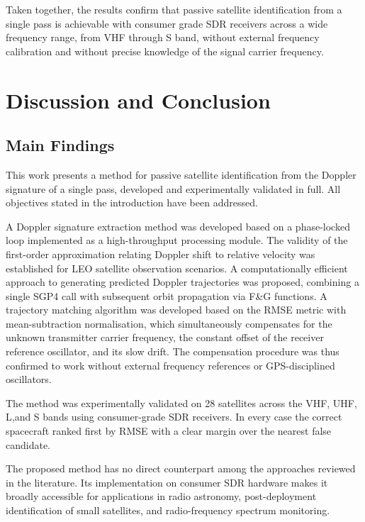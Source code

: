 \documentclass[lineno,pdflatex,sn-basic,referee,]{sn-jnl}
\begin{document}
Taken together, the results confirm that passive satellite identification from a single pass is achievable with consumer grade SDR receivers across a wide frequency range, from VHF through S band, without external frequency calibration and without precise knowledge of the signal carrier frequency.


\section{Discussion and Conclusion}
\label{sec:conclusion}

\subsection{Main Findings}
\label{subsec:findings}

This work presents a method for passive satellite identification from the Doppler signature of a single pass, developed and experimentally validated in full. All objectives stated in the introduction have been addressed.

A Doppler signature extraction method was developed based on a phase-locked loop implemented as a high-throughput processing module. The validity of the first-order approximation relating Doppler shift to relative velocity was established for LEO satellite observation scenarios. A computationally efficient approach to generating predicted Doppler trajectories was proposed, combining a single SGP4 call with subsequent orbit propagation via F\&G functions. A trajectory matching algorithm was developed based on the RMSE metric with mean-subtraction normalisation, which simultaneously compensates for the unknown transmitter carrier frequency, the constant offset of the receiver reference oscillator, and its slow drift. The compensation procedure was thus confirmed to work without external frequency references or GPS-disciplined oscillators.

The method was experimentally validated on 28 satellites across the VHF, UHF, L,and S bands using consumer-grade SDR receivers. In every case the correct spacecraft ranked first by RMSE with a clear margin over the nearest false candidate.

The proposed method has no direct counterpart among the approaches reviewed in the literature. Its implementation on consumer SDR hardware makes it broadly accessible for applications in radio astronomy, post-deployment identification of small satellites, and radio-frequency spectrum monitoring.
\end{document}
